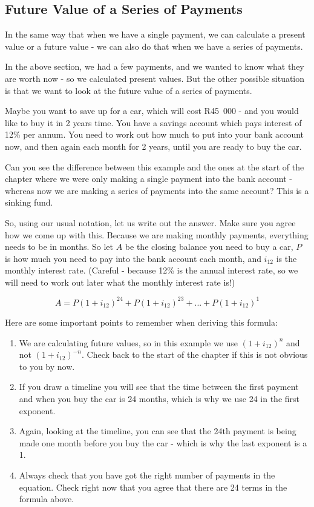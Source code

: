 \subsection{Future Value of a Series of Payments}
In the same way that when we have a single payment, we can calculate a present value or a future value - we can also do that when we have a series of payments.

In the above section, we had a few payments, and we wanted to know what they are worth now - so we calculated present values. But the other possible situation is that we want to look at the future value of a series of payments.

Maybe you want to save up for a car, which will cost R45~000 - and you would like to buy it in 2 years time. You have a savings account which pays interest of 12\% per annum. You need to work out how much to put into your bank account now, and then again each month for 2 years, until you are ready to buy the car.

Can you see the difference between this example and the ones at the start of the chapter where we were only making a single payment into the bank account - whereas now we are making a series of payments into the same account? This is a sinking fund.

So, using our usual notation, let us write out the answer. Make sure you agree how we come up with this. Because we are making monthly payments, everything needs to be in months. So let $A$ be the closing balance you need to buy a car, $P$ is how much you need to pay into the bank account each month, and $i_{12}$ is the monthly interest rate. (Careful - because 12\% is the annual interest rate, so we will need to work out later what the monthly interest rate is!)

\begin{equation*}
A = P(1+i_{12})^{24} + P(1+i_{12})^{23} + ... + P(1+i_{12})^1
\end{equation*}

Here are some important points to remember when deriving this formula:
\begin{enumerate}
\item{We are calculating future values, so in this example we use $(1+i_{12})^n$ and not $(1+i_{12})^{-n}$. Check back to the start of the chapter if this is not obvious to you by now.}
\item{If you draw a timeline you will see that the time between the first payment and when you buy the car is 24 months, which is why we use 24 in the first exponent.}
\item{Again, looking at the timeline, you can see that the 24th payment is being made one month before you buy the car - which is why the last exponent is a 1.}
\item{Always check that you have got the right number of payments in the equation. Check right now that you agree that there are 24 terms in the formula above.}
\end{enumerate}

